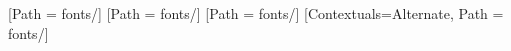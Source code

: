 \usepackage{fontspec}
\newfontface{}[Path = fonts/]
\newfontface{}[Path = fonts/]
\newfontface{}[Path = fonts/]
\setmonofont{JuliaMono-Medium.ttf}[Contextuals=Alternate, Path = fonts/]
